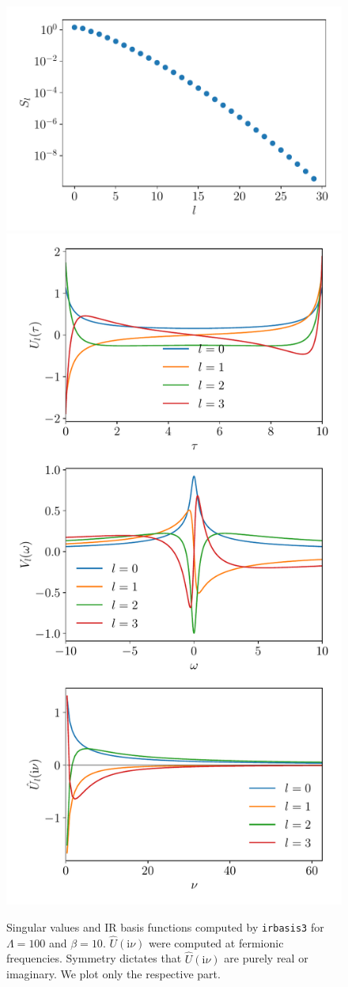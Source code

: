 \documentclass[submission, LectureNotes]{SciPost}
\newcommand\ii{\mathrm{i}}%
\newcommand\iv{\ii\nu}%
\begin{document}
\begin{figure}
    \centering
    \includegraphics[width=0.55\columnwidth]{ir_basis_svals.pdf}
    \includegraphics[width=0.55\columnwidth]{ir_basis_functions.pdf}
    \caption{
        Singular values and IR basis functions computed by \texttt{irbasis3} for $\Lambda=100$ and $\beta=10$.
        $\hat U(\iv)$ were computed at fermionic frequencies.
        Symmetry dictates that $\hat U(\iv)$ are purely real or imaginary.
        We plot only the respective part.
    }
    \label{fig:irbasis}
\end{figure}

\end{document}
